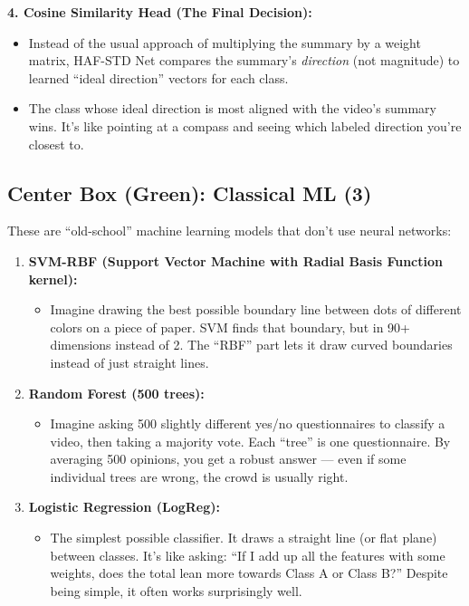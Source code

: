 \documentclass[12pt, a4paper]{article}
\begin{document}
\begin{analogybox}
\textbf{4. Cosine Similarity Head (The Final Decision):}
\begin{itemize}
    \item Instead of the usual approach of multiplying the summary by a weight matrix, HAF-STD Net compares the summary's \textit{direction} (not magnitude) to learned ``ideal direction'' vectors for each class.
    \item The class whose ideal direction is most aligned with the video's summary wins. It's like pointing at a compass and seeing which labeled direction you're closest to.
\end{itemize}
\end{analogybox}

\subsection{Center Box (Green): Classical ML (3)}

\begin{keybox}
These are ``old-school'' machine learning models that don't use neural networks:
\begin{enumerate}[leftmargin=1cm, itemsep=0.3cm]
    \item \textbf{SVM-RBF (Support Vector Machine with Radial Basis Function kernel):}
    \begin{itemize}
        \item Imagine drawing the best possible boundary line between dots of different colors on a piece of paper. SVM finds that boundary, but in 90+ dimensions instead of 2. The ``RBF'' part lets it draw curved boundaries instead of just straight lines.
    \end{itemize}
    
    \item \textbf{Random Forest (500 trees):}
    \begin{itemize}
        \item Imagine asking 500 slightly different yes/no questionnaires to classify a video, then taking a majority vote. Each ``tree'' is one questionnaire. By averaging 500 opinions, you get a robust answer — even if some individual trees are wrong, the crowd is usually right.
    \end{itemize}
    
    \item \textbf{Logistic Regression (LogReg):}
    \begin{itemize}
        \item The simplest possible classifier. It draws a straight line (or flat plane) between classes. It's like asking: ``If I add up all the features with some weights, does the total lean more towards Class A or Class B?'' Despite being simple, it often works surprisingly well.
    \end{itemize}
\end{enumerate}
\end{keybox}
\end{document}
